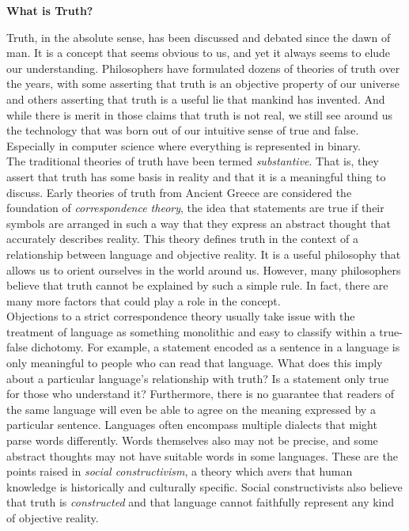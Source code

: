 \begin{tcolorbox}[breakable, enhanced, colback=textbook-blue, sharp corners]
	\vspace{2mm}
	\begin{center}
		\textbf{What is Truth?}
	\end{center}
	\vspace{1mm}
	Truth, in the absolute sense, has been discussed and debated since the dawn of man. It is a concept that seems obvious to us, and yet it always seems to elude our understanding. Philosophers have formulated dozens of theories of truth over the years, with some asserting that truth is an objective property of our universe and others asserting that truth is a useful lie that mankind has invented. And while there is merit in those claims that truth is not real, we still see around us the technology that was born out of our intuitive sense of true and false. Especially in computer science where everything is represented in binary. \\
	
	The traditional theories of truth have been termed \textit{substantive}. That is, they assert that truth has some basis in reality and that it is a meaningful thing to discuss. Early theories of truth from Ancient Greece are considered the foundation of \textit{correspondence theory}, the idea that statements are true if their symbols are arranged in such a way that they express an abstract thought that accurately describes reality. This theory defines truth in the context of a relationship between language and objective reality. It is a useful philosophy that allows us to orient ourselves in the world around us. However, many philosophers believe that truth cannot be explained by such a simple rule. In fact, there are many more factors that could play a role in the concept. \\
	
	Objections to a strict correspondence theory usually take issue with the treatment of language as something monolithic and easy to classify within a true-false dichotomy. For example, a statement encoded as a sentence in a language is only meaningful to people who can read that language. What does this imply about a particular language's relationship with truth? Is a statement only true for those who understand it? Furthermore, there is no guarantee that readers of the same language will even be able to agree on the meaning expressed by a particular sentence. Languages often encompass multiple dialects that might parse words differently. Words themselves also may not be precise, and some abstract thoughts may not have suitable words in some languages. These are the points raised in \textit{social constructivism}, a theory which avers that human knowledge is historically and culturally specific. Social constructivists also believe that truth is \textit{constructed} and that language cannot faithfully represent any kind of objective reality. \\
	

\end{tcolorbox}
